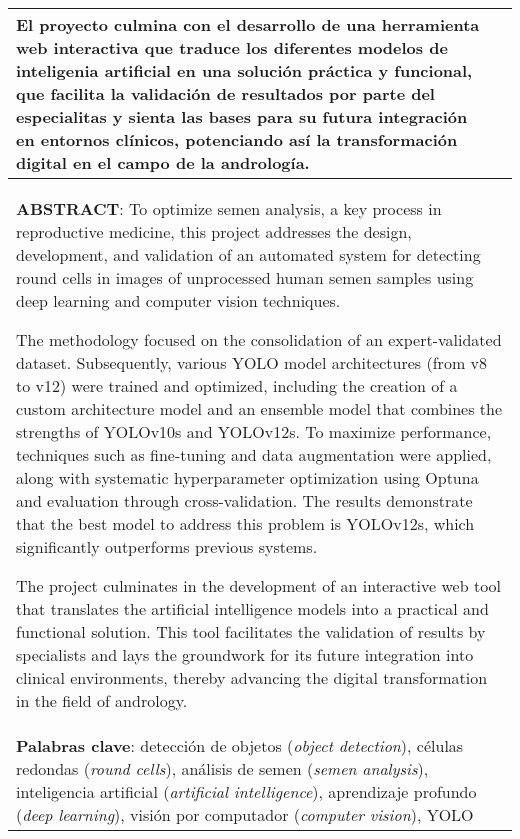 \begin{longtable}{|l|l|}
{	El proyecto culmina con el desarrollo de una herramienta web interactiva que traduce los diferentes modelos de inteligenia artificial 
	en una solución práctica y funcional, que facilita la validación de resultados por parte del especialitas y sienta las bases para su futura integración en entornos clínicos, potenciando así 
	la transformación digital en el campo de la andrología.} \\ \hline
	\multicolumn{2}{|p{17cm}|}{\textbf{ABSTRACT}: To optimize semen analysis, a key process in reproductive medicine, this project addresses the design, 
	development, and validation of an automated system for detecting round cells in images of unprocessed human semen samples using deep learning and 
	computer vision techniques.

	The methodology focused on the consolidation of an expert-validated dataset. Subsequently, various YOLO model architectures (from v8 to v12) were trained 
	and optimized, including the creation of a custom architecture model and an ensemble model that combines the strengths of YOLOv10s and YOLOv12s. 
	To maximize performance, techniques such as fine-tuning and data augmentation were applied, along with systematic hyperparameter optimization using Optuna 
	and evaluation through cross-validation. The results demonstrate that the best model to address this problem is YOLOv12s, which significantly outperforms 
	previous systems.

	The project culminates in the development of an interactive web tool that translates the artificial intelligence models into a practical and 
	functional solution. This tool facilitates the validation of results by specialists and lays the groundwork for its future integration into 
	clinical environments, thereby advancing the digital transformation in the field of andrology.} \\ 
	\hline
	\multicolumn{2}{|p{17cm}|}{\textbf{Palabras clave}: detección de objetos (\textit{object detection}), células redondas (\textit{round cells}), 
	análisis de semen (\textit{semen analysis}), inteligencia artificial (\textit{artificial intelligence}), aprendizaje profundo (\textit{deep learning}), visión por computador (\textit{computer vision}), YOLO}	\\ 
	\hline
\end{longtable}